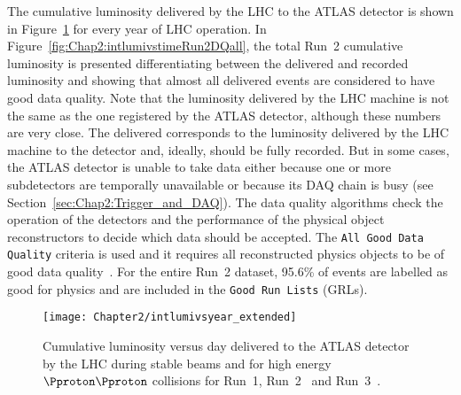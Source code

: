 The cumulative luminosity delivered by the LHC to the ATLAS detector is 
shown in Figure~\ref{fig:Chap2:intlumivsyear} for every year of LHC operation. 
In Figure~\ref{fig:Chap2:intlumivstimeRun2DQall}, the total Run~2 cumulative luminosity is presented differentiating between the delivered
and recorded luminosity and showing that almost all delivered events are considered to have good data quality. 
Note that the luminosity delivered by the LHC machine is not the same as the
one registered by the ATLAS detector, although these numbers are very close.
The delivered corresponds to the luminosity delivered by the LHC machine 
to the detector and, ideally, should be fully recorded. But in some
cases, the ATLAS detector is unable to take data either because 
one or more subdetectors are temporally unavailable or because its
DAQ chain is busy (see Section~\ref{sec:Chap2:Trigger_and_DAQ}).
The data quality algorithms check  the operation of the detectors and the performance of the physical 
object reconstructors to decide which data should be accepted.
The \texttt{All Good Data Quality} criteria is used and it requires all reconstructed physics objects to be of good data quality~\cite{ATLAS:2019fst}.  For the entire Run~2 dataset, 95.6\% of events are labelled as good for physics
and are included in the \texttt{Good Run Lists}  (GRLs).

\begin{figure}[h]
 	 \centering
 	  \texttt{[image: Chapter2/intlumivsyear\_extended]}
	  \caption{Cumulative luminosity versus day delivered to the ATLAS detector by the LHC during stable 
	  beams and for high energy $\Pproton\Pproton$ collisions for Run~1, Run~2~\cite{ATLAS:2019fst, ATLAS:2022hro} 
	  and Run~3~\cite{ATL-DAPR-PUB-2023-001}.}
	\label{fig:Chap2:intlumivsyear}
\end{figure}

